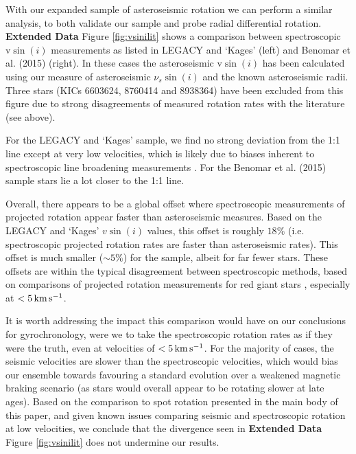 With our expanded sample of asteroseismic rotation we can perform a similar analysis, to both validate our sample and probe radial differential rotation.  \textbf{Extended Data} Figure \ref{fig:vsinilit} shows a comparison between spectroscopic $\textrm{v}\sin(i)$ measurements as listed in LEGACY and `Kages' (left) and Benomar et al. (2015) \cite{m_benomar+2015} (right). In these cases the asteroseismic $\textrm{v}\sin(i)$ has been calculated using our measure of asteroseismic $\nu_s\sin(i)$ and the known asteroseismic radii. Three stars (KICs 6603624, 8760414 and 8938364) have been excluded from this figure due to strong disagreements of measured rotation rates with the literature (see above).

For the LEGACY and `Kages' sample, we find no strong deviation from the 1:1 line except at very low velocities, which is likely due to biases inherent to spectroscopic line broadening measurements \cite{m_doyle+2014, m_tayar+2015}. For the Benomar et al. (2015) sample stars lie a lot closer to the 1:1 line.

Overall, there appears to be a global offset where spectroscopic measurements of projected rotation appear faster than asteroseismic measures. Based on the LEGACY and `Kages' $v\sin(i)$ values, this offset is roughly $18\%$ (i.e. spectroscopic projected rotation rates are faster than asteroseismic rates). This offset is much smaller ($\sim5\%$) for the \cite{m_benomar+2015} sample, albeit for far fewer stars. These offsets are within the typical disagreement between spectroscopic methods, based on comparisons of projected rotation measurements for red giant stars \cite[see Figure 2]{m_tayar+2015}, especially at $< 5\, \rm{km\,s^{-1}}$.

It is worth addressing the impact this comparison would have on our conclusions for gyrochronology, were we to take the spectroscopic rotation rates as if they were the truth, even at velocities of $< 5\, \rm{km\,s^{-1}}$. For the majority of cases, the seismic velocities are slower than the spectroscopic velocities, which would bias our ensemble towards favouring a standard evolution over a weakened magnetic braking scenario (as stars would overall appear to be rotating slower at late ages). Based on the comparison to spot rotation presented in the main body of this paper, and given known issues comparing seismic and spectroscopic rotation at low velocities, we conclude that the divergence seen in  \textbf{Extended Data} Figure \ref{fig:vsinilit} does not undermine our results.

